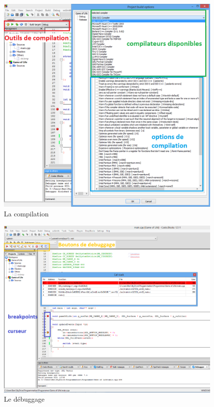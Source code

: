 \documentclass[a4paper, 12pt]{article}
\begin{document}
\begin{doublespace}
\begin{figure}
\includegraphics[scale=0.6]{./images/cb06.png}
\caption{La compilation}				
\label{cb06}				
\end{figure}

\begin{figure}
\includegraphics[scale=0.5]{./images/cb07.png}
\caption{Le débuggage}				
\label{cb07}				
\end{figure}
\end{doublespace}
\end{document}
